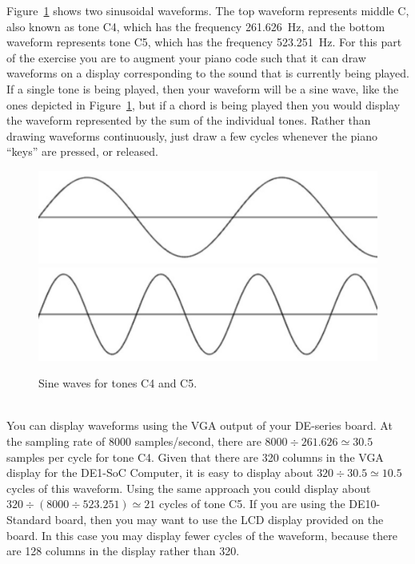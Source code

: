 \documentclass[epsfig,10pt,fullpage]{article}
\begin{document}
\noindent
Figure~\ref{fig:sinewaves} shows two sinusoidal waveforms. The top waveform represents
middle C, also known as tone C4, which has the frequency 261.626~Hz, and the bottom
waveform represents tone C5, which has the frequency 523.251~Hz. For this part of the
exercise you are to augment your piano code such that it can draw waveforms on a 
display corresponding to the sound that is currently being played. If a single tone is
being played, then your waveform will be a sine wave, like the ones depicted in
Figure~\ref{fig:sinewaves}, but if a chord is being played then
you would display the waveform represented by the sum of the individual tones.
Rather than drawing waveforms continuously, just draw a few cycles whenever the piano
``keys'' are pressed, or released. 

\begin{figure}[H]
   \begin{center}
			  \includegraphics[scale=0.67]{figures/middleC.pdf}
			  \includegraphics[scale=0.67]{figures/nextC.pdf}
   \end{center}
   \caption{Sine waves for tones C4 and C5.}
	\label{fig:sinewaves}
\end{figure}

~\\
\noindent
You can display waveforms using the VGA output of your DE-series board. At the sampling rate 
of 8000 samples/second, there are $8000 \div 261.626 \simeq 30.5$ samples per cycle for 
tone C4. Given that there are 320 columns in the VGA display for the DE1-SoC Computer, it 
is easy to display about $320 \div 30.5 \simeq 10.5$ cycles of this waveform. Using the same 
approach you could display about $320 \div (8000 \div 523.251) \simeq 21$ cycles of tone C5.
If you are using the DE10-Standard board, then you may want to use the LCD display
provided on the board. In this case you may display fewer cycles of the waveform, because 
there are 128 columns in the display rather than 320.
\end{document}
